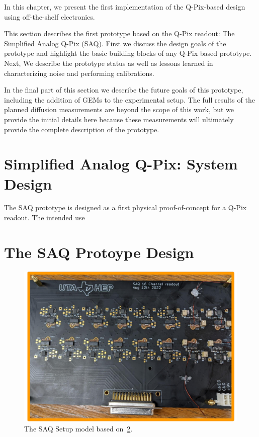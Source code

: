 In this chapter, we present the first implementation of the Q-Pix-based design using off-the-shelf electronics.

This section describes the first prototype based on the Q-Pix readout: The Simplified Analog Q-Pix (SAQ).
First we discuss the design goals of the prototype and highlight the basic building blocks of any Q-Pix based prototype.
Next, We describe the prototype status as well as lessons learned in characterizing noise and performing calibrations.

In the final part of this section we describe the future goals of this prototype, including the addition of GEMs to the experimental setup.
The full results of the planned diffusion measurements are beyond the scope of this work, but we provide the initial details here because these measurements will ultimately provide the complete description of the prototype.

\section{Simplified Analog Q-Pix: System Design}

The SAQ prototype is designed as a first physical proof-of-concept for a Q-Pix readout.
The intended use

\section{The SAQ Protoype Design}

\begin{figure}[]
\centering
\includegraphics[width=\textwidth]{images/SAQ_16_ivc_readout_board.pdf}
\caption{The SAQ Setup model based on~\ref{}.}
\end{figure}~\label{fig:saq_readout_board}

